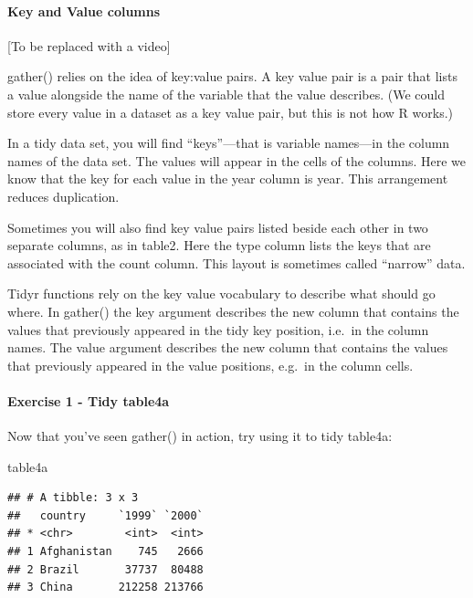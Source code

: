 \documentclass[
]{article}
\newenvironment{Shaded}{\begin{snugshade}}{\end{snugshade}}
\newcommand{\NormalTok}[1]{#1}
\begin{document}
\hypertarget{key-and-value-columns}{%
\paragraph{Key and Value columns}\label{key-and-value-columns}}

{[}To be replaced with a video{]}

gather() relies on the idea of key:value pairs. A key value pair is a
pair that lists a value alongside the name of the variable that the
value describes. (We could store every value in a dataset as a key value
pair, but this is not how R works.)

In a tidy data set, you will find ``keys''---that is variable names---in
the column names of the data set. The values will appear in the cells of
the columns. Here we know that the key for each value in the year column
is year. This arrangement reduces duplication.

Sometimes you will also find key value pairs listed beside each other in
two separate columns, as in table2. Here the type column lists the keys
that are associated with the count column. This layout is sometimes
called ``narrow'' data.

Tidyr functions rely on the key value vocabulary to describe what should
go where. In gather() the key argument describes the new column that
contains the values that previously appeared in the tidy key position,
i.e.~in the column names. The value argument describes the new column
that contains the values that previously appeared in the value
positions, e.g.~in the column cells.

\hypertarget{exercise-1---tidy-table4a}{%
\paragraph{Exercise 1 - Tidy table4a}\label{exercise-1---tidy-table4a}}

Now that you've seen gather() in action, try using it to tidy table4a:

\begin{Shaded}
\begin{Highlighting}[]
\NormalTok{table4a}
\end{Highlighting}
\end{Shaded}

\begin{verbatim}
## # A tibble: 3 x 3
##   country     `1999` `2000`
## * <chr>        <int>  <int>
## 1 Afghanistan    745   2666
## 2 Brazil       37737  80488
## 3 China       212258 213766
\end{verbatim}
\end{document}
